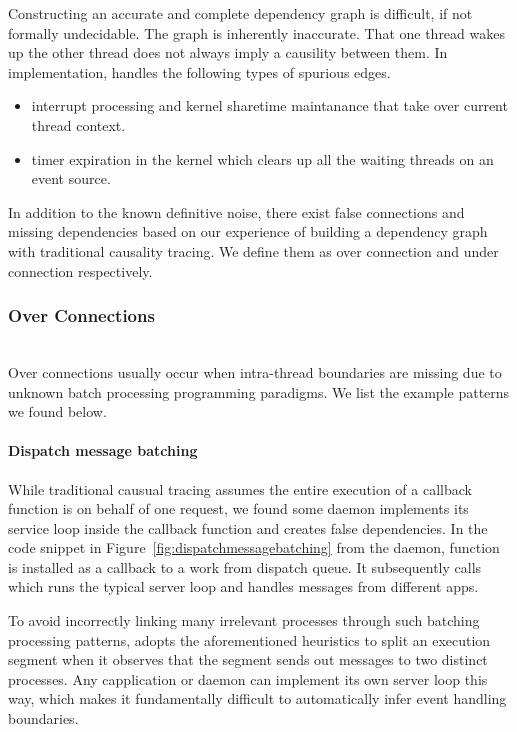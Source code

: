 Constructing an accurate and complete dependency graph is difficult, if not
formally undecidable. The graph is inherently inaccurate. That one thread
wakes up the other thread does not always imply a causility between them. In
implementation, \xxx handles the following types of spurious edges.

\begin{itemize}

\item interrupt processing and kernel sharetime maintanance that take over
current thread context.

\item timer expiration in the kernel which clears up all the waiting threads on
an event source.

\end{itemize}

\noindent In addition to the known definitive noise, there exist false connections and
missing dependencies based on our experience of building a dependency graph
with traditional causality tracing. We define them as over connection and under
connection respectively.
\vspace{1.5mm}
\subsubsection{Over Connections}\hfill\\
Over connections usually occur when intra-thread boundaries are missing due to
unknown batch processing programming paradigms. We list the example patterns we
found below.

\paragraph{Dispatch message batching}
While traditional causual tracing assumes the entire execution of a callback
function is on behalf of one request, we found some daemon implements its
service loop inside the callback function and creates false dependencies. In the
code snippet in Figure~\ref{fig:dispatchmessagebatching} from the 
daemon, function  is installed as a callback to a work
from dispatch queue. It subsequently calls  which
runs the typical server loop and handles messages from different apps.

To avoid incorrectly linking many irrelevant processes through such batching
processing patterns, \xxx adopts the aforementioned heuristics to split an
execution segment when it observes that the segment sends out messages to two
distinct processes. Any capplication or daemon can implement its own server loop
this way, which makes it fundamentally difficult to automatically infer event
handling boundaries.


